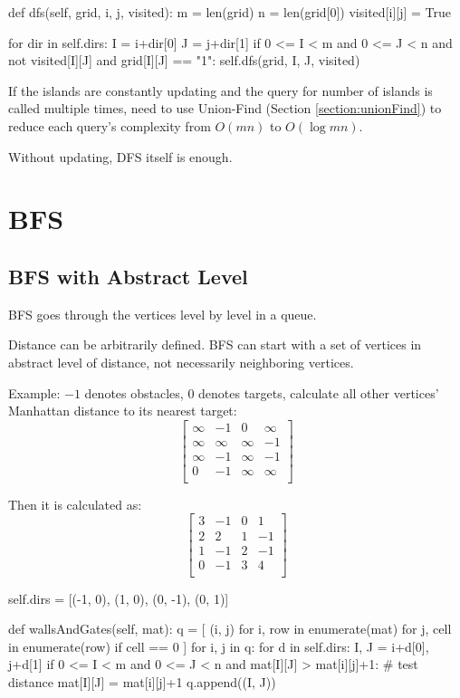 \begin{python}
  def dfs(self, grid, i, j, visited):
    m = len(grid)
    n = len(grid[0])
    visited[i][j] = True

    for dir in self.dirs:
      I = i+dir[0]
      J = j+dir[1]
      if 0 <= I < m and 0 <= J < n
        and not visited[I][J]
        and grid[I][J] == "1":
        self.dfs(grid, I, J, visited)
\end{python}
If the islands are constantly updating and the query for number of islands is called multiple times, need to use Union-Find (Section \ref{section:unionFind}) to reduce each query's complexity from $O(mn)$ to $O(\log mn)$.

Without updating, DFS itself is enough.

\section{BFS}
\subsection{BFS with Abstract Level}
BFS goes through the vertices level by level in a queue. 

Distance can be arbitrarily defined. BFS can start with a set of vertices in abstract level of distance, not necessarily neighboring vertices.

Example: $-1$ denotes obstacles, $0$ denotes targets, calculate all other vertices' Manhattan distance to its nearest target:
$$
\begin{bmatrix}
\infty & -1 & 0 & \infty \\
\infty & \infty & \infty & -1 \\
\infty & -1 & \infty & -1 \\
0 & -1 & \infty & \infty \\
\end{bmatrix}
$$

Then it is calculated as:
$$
\begin{bmatrix}
3 & -1 & 0 & 1 \\
2 & 2 & 1 & -1 \\
1 & -1 & 2 & -1 \\
0 & -1 & 3 & 4 \\
\end{bmatrix}
$$

\begin{python}
self.dirs = [(-1, 0), (1, 0), (0, -1), (0, 1)]

def wallsAndGates(self, mat):
  q = [
    (i, j) 
    for i, row in enumerate(mat)
    for j, cell in enumerate(row) 
    if cell == 0
  ]
  for i, j in q:
    for d in self.dirs:
      I, J = i+d[0], j+d[1]
      if 0 <= I < m and 0 <= J < n 
        and mat[I][J] > mat[i][j]+1:  # test distance
        mat[I][J] = mat[i][j]+1
        q.append((I, J))
\end{python}


